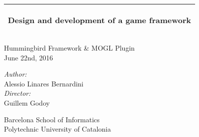 %
%
%
%
%
\begin{titlepage}
  \addtolength{\hoffset}{0.5\evensidemargin-0.5\oddsidemargin} %
  \noindent%
  \vspace{0.2cm}
  \begin{tabular}{@{}p{\textwidth}@{}}
    \toprule[2pt]
    \midrule
    \begin{center}
      \Huge{\textbf{
      Design and development of a game framework %
      }}
    \end{center}
    \vspace{0.2cm}\\
    \midrule
    \toprule[2pt]
  \end{tabular}
  \begin{center}
  \vspace{0.4cm}
    {\large
      Hummingbird Framework \& MOGL Plugin\\
      June 22nd, 2016
    }\\
    \vfill
    \vspace{0.2cm}
    {\Large
      \begin{center}
        \textit{Author:} \\
        Alessio Linares Bernardini\\
        \textit{Director:} \\
        Guillem Godoy\\
      \end{center}
    }
  \end{center}
  \vspace{0.2cm}
  \begin{center}
  Barcelona School of Informatics\\
  Polytechnic University of Catalonia
  \end{center}
\end{titlepage}
\clearpage
